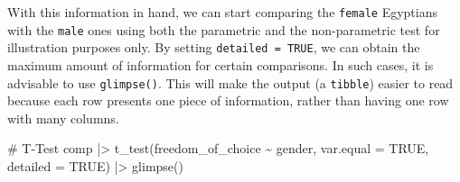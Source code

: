 \documentclass[
  letterpaper,
]{krantz}
\makeatletter
\newenvironment{Shaded}{\begin{snugshade}}{\end{snugshade}}
\newcommand{\AttributeTok}[1]{\textcolor[rgb]{0.40,0.45,0.13}{#1}}
\newcommand{\CommentTok}[1]{\textcolor[rgb]{0.37,0.37,0.37}{#1}}
\newcommand{\ConstantTok}[1]{\textcolor[rgb]{0.56,0.35,0.01}{#1}}
\newcommand{\FunctionTok}[1]{\textcolor[rgb]{0.28,0.35,0.67}{#1}}
\newcommand{\NormalTok}[1]{\textcolor[rgb]{0.00,0.23,0.31}{#1}}
\newcommand{\SpecialCharTok}[1]{\textcolor[rgb]{0.37,0.37,0.37}{#1}}
\newenvironment{kframe}{%
\medskip{}
\setlength{\fboxsep}{.8em}
 \def\at@end@of@kframe{}%
 \ifinner\ifhmode%
  \def\at@end@of@kframe{\end{minipage}}%
  \begin{minipage}{\columnwidth}%
 \fi\fi%
 \def\FrameCommand##1{\hskip\@totalleftmargin \hskip-\fboxsep
 \colorbox{shadecolor}{##1}\hskip-\fboxsep
     \hskip-\linewidth \hskip-\@totalleftmargin \hskip\columnwidth}%
 \MakeFramed {\advance\hsize-\width
   \@totalleftmargin\z@ \linewidth\hsize
   \@setminipage}}%
 {\par\unskip\endMakeFramed%
 \at@end@of@kframe}
\renewenvironment{Shaded}{\begin{kframe}}{\end{kframe}}
\makeatother
\begin{document}
\begin{table}

\caption{\label{tbl-comparing-two-groups-unpaired}Comparing two unpaired
groups}


\end{table}%

With this information in hand, we can start comparing the
\texttt{female} Egyptians with the \texttt{male} ones using both the
parametric and the non-parametric test for illustration purposes only.
By setting \texttt{detailed\ =\ TRUE}, we can obtain the maximum amount
of information for certain comparisons. In such cases, it is advisable
to use \texttt{glimpse()}. This will make the output (a \texttt{tibble})
easier to read because each row presents one piece of information,
rather than having one row with many columns.

\begin{Shaded}
\begin{Highlighting}[]
\CommentTok{\# T{-}Test}
\NormalTok{comp }\SpecialCharTok{|\textgreater{}} \FunctionTok{t\_test}\NormalTok{(freedom\_of\_choice }\SpecialCharTok{\textasciitilde{}}\NormalTok{ gender,}
                \AttributeTok{var.equal =} \ConstantTok{TRUE}\NormalTok{,}
                \AttributeTok{detailed =} \ConstantTok{TRUE}\NormalTok{) }\SpecialCharTok{|\textgreater{}}
  \FunctionTok{glimpse}\NormalTok{()}
\end{Highlighting}
\end{Shaded}
\end{document}
